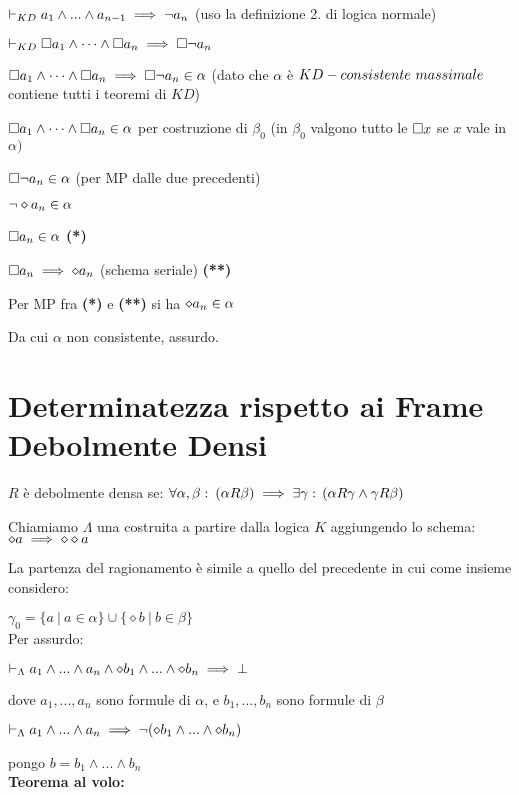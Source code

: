 $\vdash_{KD}a_{1}\wedge...\wedge a_{n-1}\implies\neg a_{n}$ (uso la definizione
2. di logica normale)

$\vdash_{KD}\square a_{1}\wedge\dots\wedge\square a_{n}\implies\square\neg a_{n}$ 

$\square a_{1}\wedge\dots\wedge\square a_{n}\implies\square\neg a_{n}\in\alpha$ (dato che $\alpha$
è $KD-consistente\ massimale$ contiene tutti i teoremi di $KD$)

$\square a_{1}\wedge\dots\wedge\square a_{n}\in\alpha$ per costruzione di $\beta_{0}$ (in $\beta_{0}$
valgono tutto le $\square x$ se $x$ vale in $\alpha)$

$\square\neg a_{n}\in\alpha$ (per MP dalle due precedenti)

$\neg\diamond a_{n}\in\alpha$

$\square a_{n}\in\alpha$ \textbf{({*})}

$\square a_{n}\implies\diamond a_{n}$ (schema seriale) \textbf{({*}{*})}

Per MP fra \textbf{({*}) }e\textbf{ ({*}{*}) }si ha $\diamond a_{n}\in\alpha$ 

Da cui $\alpha$ non consistente, assurdo. \lightning


\section{Determinatezza rispetto ai Frame Debolmente Densi}

$R$ è debolmente densa se: $\forall\alpha,\beta:\:(\alpha R\beta)\implies\exists\gamma:\,(\alpha R\gamma\wedge\gamma R\beta)$

Chiamiamo $\Lambda$ una costruita a partire dalla logica $K$ aggiungendo
lo schema: $\diamond a\implies\diamond\diamond a$ 

La partenza del ragionamento è simile a quello del precedente in cui
come insieme considero:

$\gamma_{0}=\{a\ |\ a\in\alpha\}\cup\{\diamond b\ |\ b\in\beta\}$\\


Per assurdo:

$\vdash_{\Lambda}a_{1}\wedge...\wedge a_{n}\wedge\diamond b_{1}\wedge...\wedge\diamond b_{n}\implies\bot$

dove $a_{1},...,a_{n}$ sono formule di $\alpha$, e $b_{1},...,b_{n}$
sono formule di $\beta$

$\vdash_{\Lambda}a_{1}\wedge...\wedge a_{n}\implies\neg(\diamond b_{1}\wedge...\wedge\diamond b_{n})$

pongo $b=b_{1}\wedge...\wedge b_{n}$\\


\textbf{Teorema al volo:}

